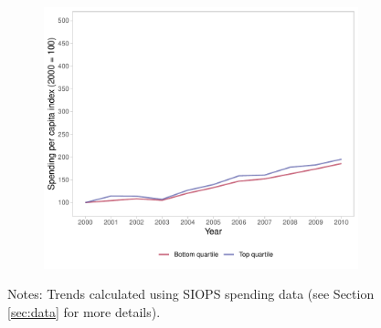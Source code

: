 \begin{figure}[h!]
\begin{center}
\begin{subfigure}{0.45\textwidth}
        \includegraphics[width=\textwidth]{plots/plot_transf.pdf}
    \end{subfigure}

    
    \end{center}\vspace{+1pt}
    
        \scriptsize{Notes: Trends calculated using SIOPS spending data (see Section \ref{sec:data} for more details).}
\end{figure}